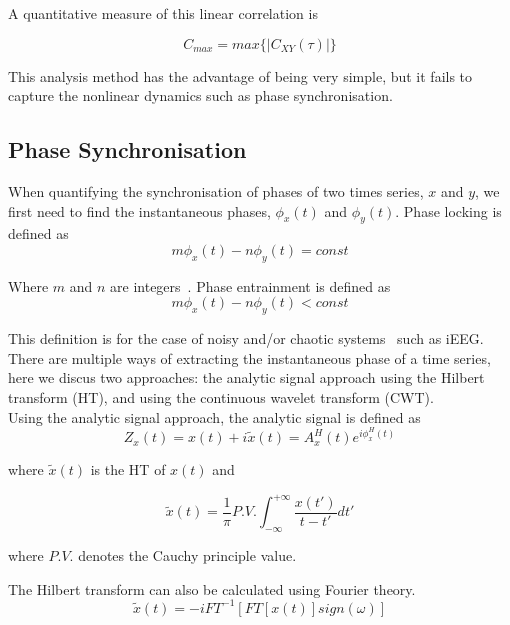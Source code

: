 \documentclass[]{article}
\begin{document}
A quantitative measure of this linear correlation is

\begin{equation}
C_{max} = max\{|C_{XY}(\tau)|\}
\end{equation}

This analysis method has the advantage of being very simple, but it
fails to capture the nonlinear dynamics such as phase
synchronisation.

\subsection{Phase Synchronisation}

When quantifying the synchronisation of phases of two times series,
$x$ and $y$, we first need to find the instantaneous phases,
$\phi_x(t)$ and $\phi_y(t)$. Phase locking is defined as
\begin{equation}
m\phi_x(t)-n\phi_y(t) = const
\end{equation}

Where $m$ and $n$ are integers~\cite{Huygens1673}. Phase
entrainment is defined as
\begin{equation}
m\phi_x(t)-n\phi_y(t) < const
\end{equation}

This definition is for the case of noisy and/or chaotic
systems~\cite{Rosenblum1996} such as iEEG.\\

There are multiple ways of extracting the instantaneous phase of a
time series, here we discus two approaches: the analytic signal
approach using the Hilbert transform (HT), and using the
continuous wavelet transform (CWT).\\

Using the analytic signal approach, the analytic signal is defined
as
\begin{equation}
Z_x(t) = x(t) + i\tilde{x}(t) = A_x^H(t)e^{i\phi_x^H(t)}
\end{equation}

where $\tilde{x}(t)$ is the HT of $x(t)$ and

\begin{equation}
\tilde{x}(t) =
\frac{1}{\pi}P.V.\int_{-\infty}^{+\infty}\frac{x(t')}{t-t'}dt'
\end{equation}

where $P.V.$ denotes the Cauchy principle value.

The Hilbert transform can also be calculated using Fourier theory.
\begin{equation}
\tilde{x}(t) = -iFT^{-1}[FT[x(t)]sign(\omega)]
\end{equation}
\end{document}
